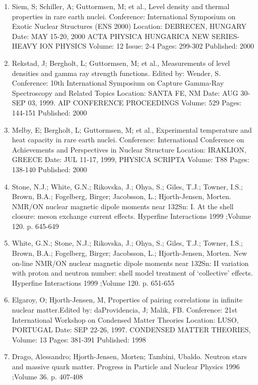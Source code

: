 \documentclass[%
oneside,                 %
final,                   %
10pt]{article}
\begin{document}
\begin{enumerate}
\item Siem, S; Schiller, A; Guttormsen, M; et al., Level density and thermal properties in rare earth nuclei. Conference: International Symposium on Exotic Nuclear Structures (ENS 2000) Location: DEBRECEN, HUNGARY Date: MAY 15-20, 2000 ACTA PHYSICA HUNGARICA NEW SERIES-HEAVY ION PHYSICS  Volume: 12   Issue: 2-4   Pages: 299-302   Published: 2000

\item Rekstad, J; Bergholt, L; Guttormsen, M; et al., Measurements of level densities and gamma ray strength functions. Edited by: Wender, S. Conference: 10th International Symposium on Capture Gamma-Ray Spectroscopy and Related Topics Location: SANTA FE, NM Date: AUG 30-SEP 03, 1999. AIP CONFERENCE PROCEEDINGS   Volume: 529   Pages: 144-151   Published: 2000

\item Melby, E; Bergholt, L; Guttormsen, M; et al., Experimental temperature and heat capacity in rare earth nuclei. Conference: International Conference on Achievements and Perspectives in Nuclear Structure Location: IRAKLION, GREECE Date: JUL 11-17, 1999, PHYSICA SCRIPTA  Volume: T88   Pages: 138-140   Published: 2000

\item Stone, N.J.; White, G.N.; Rikovska, J.; Ohya, S.; Giles, T.J.; Towner, I.S.; Brown, B.A.; Fogelberg, Birger; Jacobsson, L.; Hjorth-Jensen, Morten.  NMR/ON nuclear magnetic dipole moments near 132Sn: I. At the shell closure: meson exchange current effects. Hyperfine Interactions 1999 ;Volume 120. p. 645-649

\item White, G.N.; Stone, N.J.; Rikovska, J.; Ohya, S.; Giles, T.J.; Towner, I.S.; Brown, B.A.; Fogelberg, Birger; Jacobsson, L.; Hjorth-Jensen, Morten.  New on-line NMR/ON nuclear magnetic dipole moments near 132Sn: II variation with proton and neutron number: shell model treatment of `collective' effects. Hyperfine Interactions 1999 ;Volume 120. p. 651-655

\item Elgaroy, O; Hjorth-Jensen, M, Properties of pairing correlations in infinite nuclear matter.Edited by: daProvidencia, J; Malik, FB. Conference: 21st International Workshop on Condensed Matter Theories Location: LUSO, PORTUGAL Date: SEP 22-26, 1997. CONDENSED MATTER THEORIES, Volume: 13   Pages: 381-391   Published: 1998

\item Drago, Alessandro; Hjorth-Jensen, Morten; Tambini, Ubaldo. Neutron stars and massive quark matter. Progress in Particle and Nuclear Physics 1996 ;Volume 36. p. 407-408


\end{enumerate}
\end{document}
